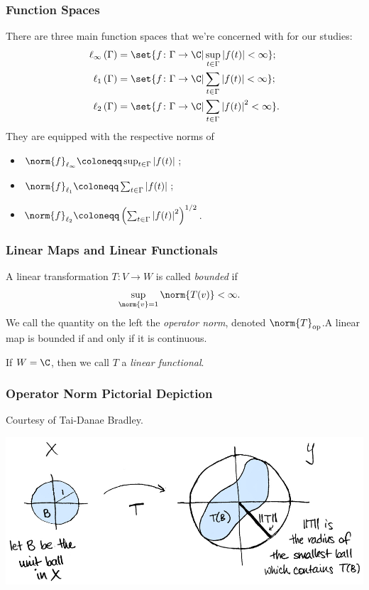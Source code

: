 \documentclass{beamer-custom}
\DeclareMathOperator{\op}{op}
\begin{document}
\begin{frame}
  \frametitle{Function Spaces}
  There are three main function spaces that we're concerned with for our studies:
  { \footnotesize \begin{align*}
    \ell_{\infty}\left( \Gamma \right) & =\set{f\colon \Gamma\rightarrow \C | \sup_{t\in\Gamma}\left\vert f(t) \right\vert < \infty};\\
    \ell_{1}\left( \Gamma \right) &= \set{f\colon \Gamma\rightarrow \C | \sum_{t\in\Gamma}\left\vert f(t) \right\vert < \infty};\\
    \ell_2\left( \Gamma \right) &= \set{f\colon \Gamma\rightarrow \C | \sum_{t\in\Gamma}\left\vert f(t) \right\vert^2 < \infty}.
  \end{align*}}\pause
  They are equipped with the respective norms of
  \begin{itemize}
    \item $\norm{f}_{\ell_{\infty}} \coloneqq \sup_{t\in\Gamma}\left\vert f(t) \right\vert$;
    \item $\norm{f}_{\ell_1}\coloneqq \sum_{t\in\Gamma}\left\vert f(t) \right\vert$;
    \item $\norm{f}_{\ell_2}\coloneqq \left( \sum_{t\in\Gamma}\left\vert f(t) \right\vert^2 \right)^{1/2}$.
  \end{itemize}
\end{frame}
\begin{frame}
  \frametitle{Linear Maps and Linear Functionals}
  A linear transformation $T\colon V\rightarrow W$ is called \textit{bounded} if
  \begin{align*}
    \sup_{\norm{v}=1}\norm{T(v)} &< \infty.
  \end{align*}\pause
  We call the quantity on the left the \textit{operator norm}, denoted $\norm{T}_{\op}$.\pause\:A linear map is bounded if and only if it is continuous.\pause\newline

  If $W = \C$, then we call $T$ a \textit{linear functional}.
\end{frame}
\begin{frame}
  \frametitle{Operator Norm Pictorial Depiction}
  Courtesy of Tai-Danae Bradley.
  \begin{center}
    \includegraphics{images/operator_norm_depiction.png}
  \end{center}
\end{frame}
\end{document}
